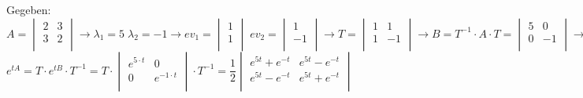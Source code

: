 Gegeben: $A = 	\begin{vmatrix} 
	        		2 & 3\\ 
	        		3 & 2\\   
				\end{vmatrix} \rightarrow
				\lambda_1=5 \; \lambda_2=-1 \rightarrow ev_1=\begin{vmatrix}
					1\\ 
					1\\   
				\end{vmatrix} \;
				ev_2=\begin{vmatrix}
					1\\ 
					-1\\   
				\end{vmatrix} \rightarrow
				T=\begin{vmatrix} 
	        		1 & 1\\ 
	        		1 & -1\\   
				\end{vmatrix} \rightarrow 
				B=T^{-1} \cdot A \cdot T=\begin{vmatrix} 
	        		5 & 0\\ 
	        		0 & -1\\   
				\end{vmatrix} \rightarrow$\\
				\hspace*{4cm}$e^{tA}=T \cdot e^{tB} \cdot T^{-1}=
				T \cdot \begin{vmatrix} 
					e^{5 \cdot t} & 0\\ 
					0 & e^{-1 \cdot t}\\   
				\end{vmatrix} \cdot T^{-1} =
				\dfrac{1}{2}\begin{vmatrix} 
					e^{5 t} + e^{-t}& e^{5 t} - e^{-t}\\ 
					e^{5 t} - e^{-t} & e^{5 t} + e^{-t}\\   
				\end{vmatrix}$


